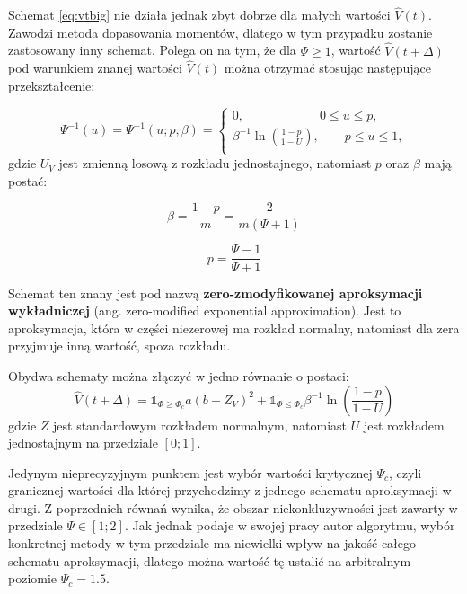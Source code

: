 \documentclass{pracamgr}
\begin{document}
Schemat \ref{eq:vtbig} nie działa jednak zbyt dobrze dla małych wartości $\hat{V}(t)$. Zawodzi metoda 
dopasowania momentów, dlatego w tym przypadku 
zostanie zastosowany inny schemat. Polega on na tym, że dla $\Psi \geq 1$, wartość 
$\hat{V}(t + \Delta)$ pod warunkiem znanej wartości $\hat{V}(t)$ można otrzymać 
stosując następujące przekształcenie:

\begin{equation}
\label{eq:psi}
\Psi^{-1}(u) = \Psi^{-1}(u;p,\beta) = \begin{cases}
               0, \qquad \qquad \qquad  0 \le u \leq p,\\
               \beta^{-1} \ln (\frac{1-p}{1-U}), \qquad  p \le u \leq 1, \\
            \end{cases} 
\end{equation} 
gdzie $U_V$ jest zmienną losową z rozkładu jednostajnego, natomiast $p$ oraz $\beta$ mają postać:

\begin{equation}
\label{eq:beta}
\beta = \frac{1-p}{m} = \frac{2}{m(\Psi + 1)}
\end{equation}

\begin{equation}
\label{eq:p}
p = \frac{\Psi - 1}{\Psi + 1}
\end{equation}

Schemat ten znany jest pod nazwą \textbf{zero-zmodyfikowanej aproksymacji wykładniczej} 
(ang. zero-modified exponential approximation). Jest to aproksymacja, która w części niezerowej ma 
rozkład normalny, natomiast dla zera przyjmuje inną wartość, spoza rozkładu. 


Obydwa schematy można złączyć w jedno równanie o postaci:
\begin{equation}
\label{eq:andersen}
\hat{V}(t + \Delta)  = \mathds{1}_{\Phi \geq \Phi_c} a (b + Z_V)^2
 + \mathds{1}_{\Phi \le \Phi_c} \beta^{-1} \ln (\frac{1-p}{1-U})
\end{equation}
gdzie $Z$ jest standardowym rozkładem normalnym, natomiast $U$ jest rozkładem jednostajnym na 
przedziale $[0;1]$.


Jedynym nieprecyzyjnym punktem jest wybór wartości krytycznej $\Psi_c$, czyli granicznej wartości dla 
której przychodzimy z jednego schematu aproksymacji w drugi. 
Z poprzednich równań wynika, że obszar niekonkluzywności jest zawarty w przedziale $\Psi \in [1;2]$.
Jak jednak podaje w swojej pracy autor algorytmu, wybór konkretnej metody w tym przedziale ma 
niewielki wpływ na jakość całego schematu aproksymacji, dlatego można wartość tę ustalić na 
arbitralnym poziomie $\Psi_c = 1.5$. 
 
\end{document}
